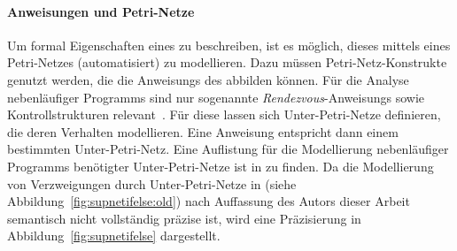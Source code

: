 \paragraph{Anweisungen und Petri-Netze}
Um formal Eigenschaften eines  zu beschreiben, ist es möglich, dieses mittels eines Petri-Netzes (automatisiert) zu modellieren. Dazu müssen Petri-Netz-Konstrukte genutzt werden, die die \glspl{Anweisung} des  abbilden können. Für die Analyse nebenläufiger \glspl{Programm} sind nur sogenannte \emph{Rendezvous}-\glspl{Anweisung} sowie Kontrollstrukturen relevant~\cite{Goel1990}. Für diese lassen sich Unter-Petri-Netze definieren, die deren Verhalten modellieren. Eine Anweisung entspricht dann einem bestimmten Unter-Petri-Netz. Eine Auflistung für die Modellierung nebenläufiger \glspl{Programm} benötigter Unter-Petri-Netze ist in \cite{Goel1990} zu finden. Da die Modellierung von Verzweigungen durch Unter-Petri-Netze in \cite[Abbildung 3.1]{Goel1990} (siehe Abbildung~\ref{fig:supnetifelse:old}) nach Auffassung des Autors dieser Arbeit semantisch nicht vollständig präzise ist, wird eine Präzisierung in Abbildung~\ref{fig:supnetifelse} dargestellt. 
